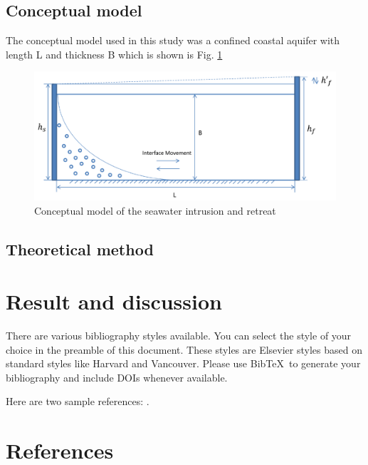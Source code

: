 \documentclass[review]{elsarticle}
\begin{document}
\subsection{Conceptual model}

The conceptual model used in this study was a confined coastal aquifer with length L and thickness B which is shown is Fig. \ref{fig:seawater_intrusion}
\begin{figure}
\centering
\includegraphics[width=1.0\textwidth]{figures/seawater_intrusion}
\caption{Conceptual model of the seawater intrusion and retreat}
\label{fig:seawater_intrusion}
\end{figure}

\subsection{Theoretical method}

\section{Result and discussion}

There are various bibliography styles available. You can select the style of your choice in the preamble of this document. These styles are Elsevier styles based on standard styles like Harvard and Vancouver. Please use Bib\TeX\ to generate your bibliography and include DOIs whenever available.

Here are two sample references: \cite{Feynman1963118,Dirac1953888}.

\section*{References}


\end{document}
